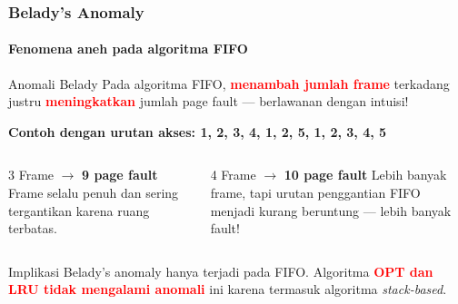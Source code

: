 \documentclass[t,aspectratio=169,xcolor=dvipsnames]{beamer}
\newcommand{\tem}[1]{\textbf{\textcolor{red}{#1}}}
\begin{document}
\begin{frame}
    \frametitle{Belady's Anomaly}
    \framesubtitle{Fenomena aneh pada algoritma FIFO}
    \footnotesize

    \begin{alertblock}{Anomali Belady}
        Pada algoritma FIFO, \tem{menambah jumlah frame} terkadang justru \tem{meningkatkan} jumlah page fault — berlawanan dengan intuisi!
    \end{alertblock}

    \vspace{0.15cm}
    \textbf{Contoh dengan urutan akses: 1, 2, 3, 4, 1, 2, 5, 1, 2, 3, 4, 5}

    \vspace{0.1cm}
    \begin{columns}[T]
        \begin{block}{3 Frame $\rightarrow$ \textbf{9 page fault}}
            Frame selalu penuh dan sering tergantikan karena ruang terbatas.
        \end{block}

        \begin{block}{4 Frame $\rightarrow$ \textbf{10 page fault}}
            Lebih banyak frame, tapi urutan penggantian FIFO menjadi kurang beruntung — lebih banyak fault!
        \end{block}
    \end{columns}

    \vspace{0.15cm}
    \begin{exampleblock}{Implikasi}
        Belady's anomaly hanya terjadi pada FIFO. Algoritma \tem{OPT dan LRU tidak mengalami anomali} ini karena termasuk algoritma \textit{stack-based}.
    \end{exampleblock}
\end{frame}
\end{document}
